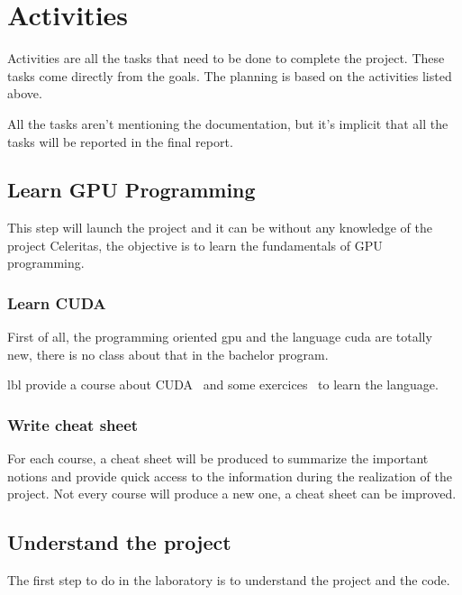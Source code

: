 \chapter{Activities}
\label{spec:ch:activities}

Activities are all the tasks that need to be done to complete the project. These tasks
come directly from the goals. The planning is based on the activities listed above.

All the tasks aren't mentioning the documentation, but it's implicit that all the tasks will be reported in the final report.

\section{Learn GPU Programming}
\label{spec:ch:activities:learn-gpu-programming}

This step will launch the project and it can be without any knowledge of the project Celeritas, the objective is to learn the fundamentals of GPU programming.


\subsection{Learn CUDA}
\label{spec:ch:activities:learn-gpu-programming:learn-cuda}

First of all, the programming oriented \acrshort{gpu} and the language \acrshort{cuda} are totally new, there is no class about that in the bachelor program.

\acrlong{lbl} provide a course about CUDA~\cite{cuda-training} and some exercices~\cite{cuda-series} to learn the language. 


\subsection{Write cheat sheet}
\label{spec:spec:ch:activities:learn-gpu-programming:write-cheat-sheet}

For each course, a cheat sheet will be produced to summarize the important notions and provide quick access to the information during the realization of the project.
Not every course will produce a new one, a cheat sheet can be improved.


\section{Understand the project}
\label{spec:ch:activities:understand-the-project}
The first step to do in the laboratory is to understand the project and the code.


